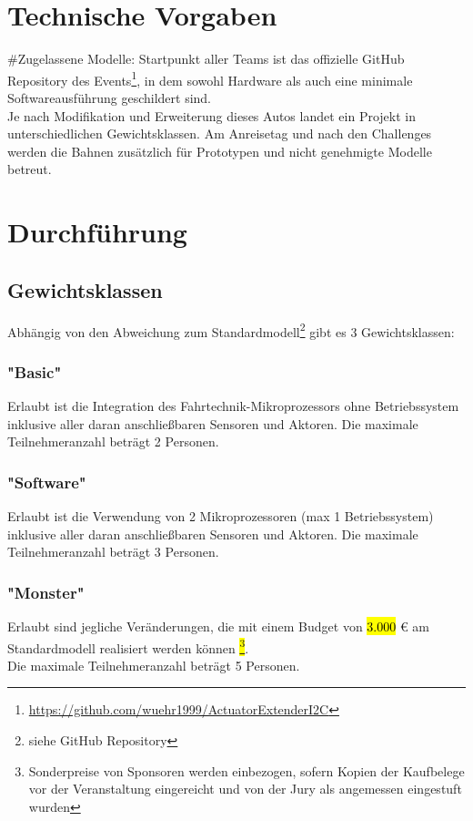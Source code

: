 \documentclass[11pt]{article}
\begin{document}
\section{Technische Vorgaben}
\#Zugelassene Modelle: Startpunkt aller Teams ist das offizielle GitHub Repository des Events\footnote{\url{https://github.com/wuehr1999/ActuatorExtenderI2C}}, in dem sowohl Hardware als auch eine minimale Softwareausführung geschildert sind.\\
Je nach Modifikation und Erweiterung dieses Autos landet ein Projekt in unterschiedlichen Gewichtsklassen. 
Am Anreisetag und nach den Challenges werden die Bahnen zusätzlich für Prototypen und nicht genehmigte Modelle betreut.\\

\section{Durchführung}
\subsection{Gewichtsklassen}
Abhängig von den Abweichung zum Standardmodell\footnote{siehe GitHub Repository} gibt es 3 Gewichtsklassen:

\subsubsection{"Basic"}
Erlaubt ist die Integration des Fahrtechnik-Mikroprozessors ohne Betriebssystem inklusive aller daran anschließbaren Sensoren und Aktoren.
Die maximale Teilnehmeranzahl beträgt 2 Personen.

\subsubsection{"Software"}
Erlaubt ist die Verwendung von 2 Mikroprozessoren (max 1 Betriebssystem) inklusive aller daran anschließbaren Sensoren und Aktoren.
Die maximale Teilnehmeranzahl beträgt 3 Personen.

\subsubsection{"Monster"}
Erlaubt sind jegliche Veränderungen, die mit einem Budget von \hl{3.000} € am Standardmodell realisiert werden können \hl{\footnote{Sonderpreise von Sponsoren werden einbezogen, sofern Kopien der Kaufbelege vor der Veranstaltung eingereicht und von der Jury als angemessen eingestuft wurden}}.\\
Die maximale Teilnehmeranzahl beträgt 5 Personen.
\end{document}
